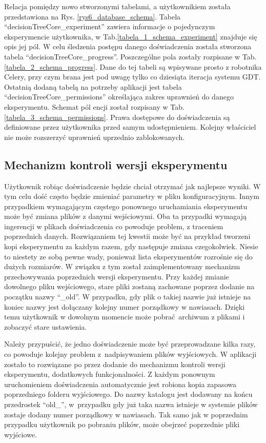 Relacja pomiędzy nowo stworzonymi tabelami, a użytkownikiem została przedstawiona na Rys. \ref{rys6_database_schema}. Tabela \enquote{decisionTreeCore\_experiment} zawiera informacje o pojedynczym eksperymencie użytkownika, w Tab.\ref{tabela_1_schema_experiment} znajduje się opis jej pól. W celu śledzenia postępu danego doświadczenia została stworzona tabela \enquote{decisionTreeCore\_progress}. Poszczególne pola zostały rozpisane w Tab.\ref{tabela_2_schema_progress}. Dane do tej tabeli są wpisywane prosto z robotnika Celery, przy czym brana jest pod uwagę tylko co dziesiąta iteracja systemu GDT. Ostatnią dodaną tabelą na potrzeby aplikacji jest tabela  \enquote{decisionTreeCore\_permissions} określająca zakres uprawnień do danego eksperymentu. Schemat pól encji został rozpisany w Tab.\ref{tabela_3_schema_permissions}. Prawa dostępowe do doświadczenia są definiowane przez użytkownika przed samym udostępnieniem. Kolejny właściciel nie może rozszerzyć uprawnień uprzednio zablokowanych.  





\subsection{Mechanizm kontroli wersji eksperymentu}
Użytkownik robiąc doświadczenie będzie chciał otrzymać jak najlepsze wyniki. W tym celu dość często będzie zmieniać parametry w pliku konfiguracyjnym. Innym przypadkiem wymagającym częstego ponownego uruchamiania eksperymentu może być zmiana plików z danymi wejściowymi. Oba ta przypadki wymagają ingerencji w plikach doświadczenia co powoduje problem, z traceniem poprzednich danych. Rozwiązaniem tej kwestii może być na przykład tworzeni kopi eksperymentu za każdym razem, gdy następuje zmiana czegokolwiek. Niesie to niestety ze sobą pewne wady, ponieważ lista eksperymentów rozrośnie się do dużych rozmiarów. W związku z tym został zaimplementowany mechanizm przechowywania poprzednich wersji eksperymentu. Przy każdej zmianie dowolnego pliku wejściowego, stare pliki zostaną zachowane poprzez dodanie na początku nazwy \enquote{\_old}. W przypadku, gdy plik o takiej nazwie już istnieje na koniec nazwy jest dołączany kolejny numer porządkowy w nawiasach. Dzięki temu użytkownik w dowolnym momencie może pobrać archiwum z plikami i zobaczyć stare ustawienia.

Należy przypuścić, że jedno doświadczenie może być przeprowadzane kilka razy, co powoduje kolejny problem z~nadpisywaniem plików wyjściowych. W aplikacji zostało to rozwiązane po przez dodanie do mechanizmu kontroli wersji eksperymentu, dodatkowych funkcjonalności. Z każdym ponownym uruchomieniem doświadczenia automatycznie jest robiona kopia zapasowa poprzedniego folderu wyjściowego. Do nazwy katalogu jest dodawany na końcu przedrostek \enquote{old\_}, w~przypadku gdy już taka nazwa istnieje w systemie plików zostaje dodany numer porządkowy w nawiasach. Tak samo jak w poprzednim przypadku użytkownik po pobraniu plików, może obejrzeć poprzednie pliki wyjściowe. 

